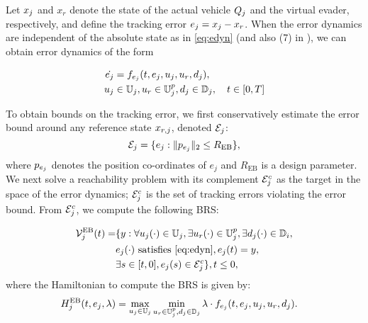 Let $x_j$ and $x_r$ denote the state of the actual vehicle $Q_j$ and the virtual evader, respectively, and define the tracking error $e_j=x_j-x_r$. When the error dynamics are independent of the absolute state as in \eqref{eq:edyn} (and also (7) in \cite{Mitchell05}), we can obtain error dynamics of the form

\begin{equation}
\label{eq:edyn} %
\begin{aligned}
\dot{e_j} &= \fdyn_{e_j}(t, e_j, \ctrl_j, \ctrl_r,\dstb_j), \\
\ctrl_j &\in \cfset_j, \ctrl_r \in \cfset^\pos_j, \dstb_j \in \dfset_j, \quad t \in [0, T]
\end{aligned}
\end{equation}

To obtain bounds on the tracking error, we first conservatively estimate the error bound around any reference state $x_{r,j}$, denoted $\mathcal{E}_j$:
\begin{equation} \label{eqn:err}
\errorbound_j = \{e_j: \|\pos_{e_j}\|_2 \le R_{\text{EB}} \}, 
\end{equation}
where $p_{e_j}$ denotes the position co-ordinates of $e_j$ and $R_{\text{EB}}$ is a design parameter. We next solve a reachability problem with its complement $\mathcal{E}_j^c$ as the target in the space of the error dynamics; $\mathcal{E}_j^c$ is the set of tracking errors violating the error bound. From $\mathcal{E}_j^c$, we compute the following BRS:

\begin{equation} \label{eqn:errBound}
\begin{aligned}
\brs^{\text{EB}}_{j}(t) = & \{y: \forall \ctrl_j(\cdot) \in \cfset_j, \exists \ctrl_r(\cdot) \in \cfset^\pos_j, \exists \dstb_j(\cdot) \in \dfset_i, \\
& e_j(\cdot) \text{ satisfies \eqref{eq:edyn}}, e_j(t) = y, \\
& \exists s \in [t, 0], e_j(s) \in \errorbound_j^c\}, t \leq 0, 
\end{aligned}
\end{equation}
where the Hamiltonian to compute the BRS is given by:
\begin{equation}
\begin{aligned}
H^{\text{EB}}_{j}(t, e_j, \lambda) &= \max_{u_j \in \mathbb{U}_j} \min_{u_r \in \mathbb{U}^p_j, d_j \in \mathbb{D}_j} \lambda \cdot f_{e_j}(t, e_j, u_j, u_r, d_j).
\end{aligned}
\end{equation}

